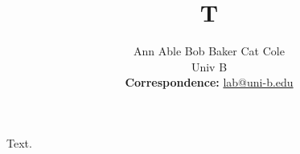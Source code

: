 \documentclass{article}
\title{T}
\author{Ann Able \quad Bob Baker \quad Cat Cole \\
Univ B \\
\small{
  \textbf{Correspondence:} \href{mailto:lab@uni-b.edu}{lab@uni-b.edu}
}
}
\begin{document}
\maketitle
Text.
\end{document}
